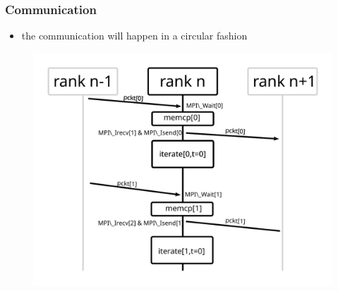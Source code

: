 \documentclass[]{scrartcl}
\begin{document}
\subsubsection{Communication}
\begin{itemize}
  \item the communication will happen in  a circular fashion
\end{itemize}

\begin{figure}[H]
  \centering
  \includegraphics[width=.8\columnwidth]{./img/comm_overlap.pdf}
  \caption{}
  \label{}
\end{figure}
\end{document}

